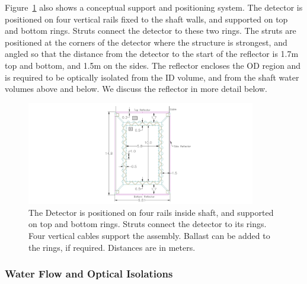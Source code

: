 Figure~\ref{fig:detdesign} also shows a conceptual support
 and positioning system. The detector is positioned on four vertical rails fixed to the shaft walls,
 and supported on top and bottom rings. Struts connect the detector to these two rings. The struts 
are positioned
 at the corners of the detector where the structure is strongest, and angled so that
 the distance from the detector to the start of the reflector is 1.7m top and bottom, and 1.5m
 on the sides. The reflector encloses the OD region and is required to be optically isolated from
 the ID volume, and from the shaft water volumes above and below. We discuss the reflector
 in more detail below.

\begin{figure}[htpb]
\centering\includegraphics[bb=600 0 1450 820,clip,width=10cm]{figures/fig3-1.jpg}
\caption{The Detector is positioned on four rails inside shaft, and supported on top and bottom rings.
 Struts connect the detector to its rings. Four vertical cables support the assembly. Ballast can be 
added to the rings, if required. Distances are in meters.}
\label{fig:detdesign}
\end{figure}

\subsubsection{Water Flow and Optical Isolations}

